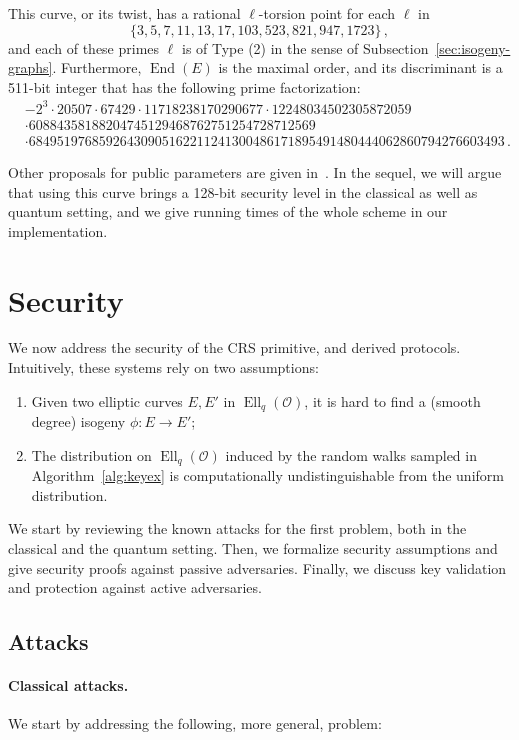 \documentclass{article}
\renewcommand{\O}{\mathcal{O}}
\theoremstyle{definition}
\DeclareMathOperator{\End}{End}
\DeclareMathOperator{\Ell}{Ell}
\begin{document}
This curve, or its twist, has a rational $\ell$-torsion point 
for each $\ell$ in
\[
  \{3, 5, 7, 11, 13, 17, 103, 523, 821, 947, 1723\}
  \,,
\]
and each of these primes $\ell$ is of Type (2)
in the sense of Subsection~\ref{sec:isogeny-graphs}.
Furthermore, $\End(E)$ is the maximal order, and its discriminant is
a 511-bit integer that has the following prime factorization:
\[
\begin{aligned}
& -2^3 \cdot 20507 \cdot 67429 \cdot 11718238170290677 \cdot 12248034502305872059 \\
& \cdot 60884358188204745129468762751254728712569\\
& \cdot 68495197685926430905162211241300486171895491480444062860794276603493\,.
\end{aligned}
\]

Other proposals for public parameters are given in~\cite{todo:memoire}.
In the sequel, we will argue that using this curve brings a 128-bit security level
in the classical as well as quantum setting, and we give running times of the whole
scheme in our implementation.

\section{Security}
\label{sec:sec}

We now address the security of the CRS primitive, and derived
protocols. Intuitively, these systems rely on two assumptions:
\begin{enumerate}
\item Given two elliptic curves $E,E'$ in $\Ell_q(\O)$, it is hard to
  find a (smooth degree) isogeny $ϕ:E→E'$;
\item The distribution on $\Ell_q(\O)$ induced by the random walks
  sampled in Algorithm~\ref{alg:keyex} is computationally
  undistinguishable from the uniform distribution.
\end{enumerate}

We start by reviewing the known attacks for the first problem, both in
the classical and the quantum setting. Then, we formalize security
assumptions and give security proofs against passive adversaries.
Finally, we discuss key validation and protection against active
adversaries.

\subsection{Attacks}
\label{sec:attacks}

\paragraph{Classical attacks.}
We start by addressing the following, more general, problem:
\end{document}
